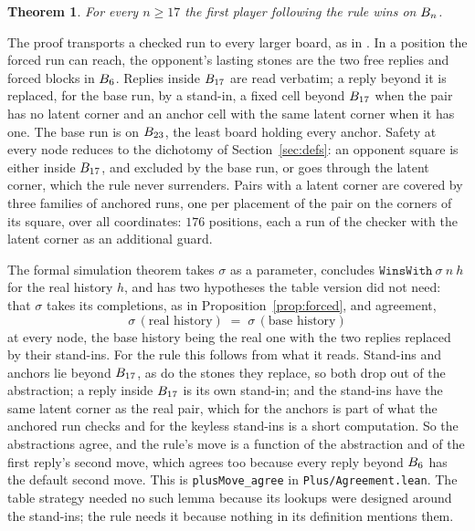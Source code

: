 \documentclass[11pt]{amsart}
\newtheorem{theorem}{Theorem}[section]
\theoremstyle{definition}
\theoremstyle{remark}
\begin{document}
\begin{theorem}\label{thm:uniform}
For every $n \ge 17$ the first player following the rule wins on
$B_n$.
\end{theorem}

The proof transports a checked run to every larger board, as in
\cite[Section~6]{reid-threshold}. In a position the forced run can
reach, the opponent's lasting stones are the two free replies and
forced blocks in $B_6$. Replies inside $B_{17}$ are read
verbatim; a reply beyond it is replaced, for the base run, by a
stand-in, a fixed cell beyond $B_{17}$ when the pair has no latent
corner and an anchor cell with the same latent corner when it has one.
The base run is on $B_{23}$, the least board holding every
anchor. Safety at every node reduces to the dichotomy of
Section~\ref{sec:defs}: an opponent square is either inside
$B_{17}$, and excluded by the base run, or goes through the
latent corner, which the rule never surrenders. Pairs with a latent
corner are covered by three families of anchored runs, one per
placement of the pair on the corners of its square, over all
coordinates: $176$ positions, each a run of the checker with the
latent corner as an additional guard.

The formal simulation theorem takes $\sigma$ as a parameter, concludes
$\texttt{WinsWith}\ \sigma\ n\ h$ for the real history $h$, and has
two hypotheses the table version did not need: that $\sigma$ takes its
completions, as in Proposition~\ref{prop:forced}, and agreement,
\[
  \sigma\,(\text{real history}) \;=\; \sigma\,(\text{base history})
\]
at every node, the base history being the real one with the two
replies replaced by their stand-ins. For the rule this follows from
what it reads. Stand-ins and anchors lie beyond $B_{17}$, as do
the stones they replace, so both drop out of the abstraction; a reply
inside $B_{17}$ is its own stand-in; and the stand-ins have the
same latent corner as the real pair, which for the anchors is part of
what the anchored run checks and for the keyless stand-ins is a short
computation. So the abstractions agree, and the rule's move is a
function of the abstraction and of the first reply's second move,
which agrees too because every reply beyond $B_6$ has the default
second move. This is \texttt{plusMove\_agree} in
\texttt{Plus/Agreement.lean}. The table strategy needed no such lemma
because its lookups were designed around the stand-ins; the rule needs
it because nothing in its definition mentions them.
\end{document}
